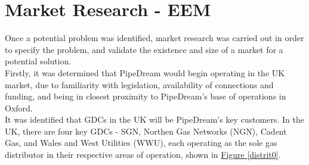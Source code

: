 \documentclass[11pt]{article}		%
\newcommand{\figref}[1]{\hyperref[#1]{Figure \ref*{#1}}}    %
\begin{document}
    \section{Market Research - EEM}
    
     Once a potential problem was identified, market research was carried out in order to specify the problem, and validate the existence and size of a market for a potential solution. 
        \\
        \hspace*{2ex}Firstly, it was determined that PipeDream would begin operating in the UK market, due to familiarity with legislation, availability of connections and funding, and being in closest proximity to PipeDream's base of operations in Oxford. 
        \\
        \hspace*{2ex}It was identified that GDCs in the UK will be PipeDream's key customers. In the UK, there are four key GDCs - SGN, Northen Gas Networks (NGN), Cadent Gas, and Wales and West Utilities (WWU), each operating as the sole gas distributor in their respective areas of operation, shown in \figref{distrit0}. 
\end{document}
